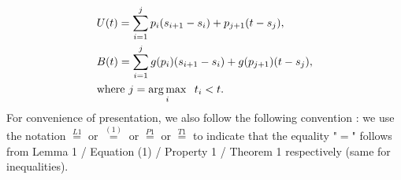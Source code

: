 \begin{align}
&U(t)=\sum_{i=1}^{j} p_i(s_{i+1}-s_i)+p_{j+1}(t-s_j) ,
\\
&B(t)=\sum_{i=1}^{j} g(p_i)(s_{i+1}-s_i)+g(p_{j+1})(t-s_j),
\\
&\text{where }j=\operatorname*{arg\,max}_{i} \hspace{2mm}t_i<t.\nonumber
\end{align}
For convenience of presentation, we also follow the following convention : we use the notation $\stackrel{L1}{=}$ or $\stackrel{(1)}{=}$ or $\stackrel{P1}{=}$ or $\stackrel{T1}{=}$ to indicate that the equality "$=$" follows from Lemma 1 / Equation (1) / Property 1 / Theorem 1 respectively (same for inequalities).